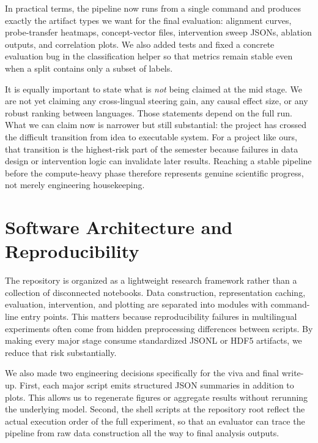 \documentclass[11pt]{article}
\begin{document}
In practical terms, the pipeline now runs from a single command and produces exactly the artifact types we want for the final evaluation: alignment curves, probe-transfer heatmaps, concept-vector files, intervention sweep JSONs, ablation outputs, and correlation plots. We also added tests and fixed a concrete evaluation bug in the classification helper so that metrics remain stable even when a split contains only a subset of labels.

It is equally important to state what is \emph{not} being claimed at the mid stage. We are not yet claiming any cross-lingual steering gain, any causal effect size, or any robust ranking between languages. Those statements depend on the full run. What we can claim now is narrower but still substantial: the project has crossed the difficult transition from idea to executable system. For a project like ours, that transition is the highest-risk part of the semester because failures in data design or intervention logic can invalidate later results. Reaching a stable pipeline before the compute-heavy phase therefore represents genuine scientific progress, not merely engineering housekeeping.

\section{Software Architecture and Reproducibility}
The repository is organized as a lightweight research framework rather than a collection of disconnected notebooks. Data construction, representation caching, evaluation, intervention, and plotting are separated into modules with command-line entry points. This matters because reproducibility failures in multilingual experiments often come from hidden preprocessing differences between scripts. By making every major stage consume standardized JSONL or HDF5 artifacts, we reduce that risk substantially.

We also made two engineering decisions specifically for the viva and final write-up. First, each major script emits structured JSON summaries in addition to plots. This allows us to regenerate figures or aggregate results without rerunning the underlying model. Second, the shell scripts at the repository root reflect the actual execution order of the full experiment, so that an evaluator can trace the pipeline from raw data construction all the way to final analysis outputs.
\end{document}
